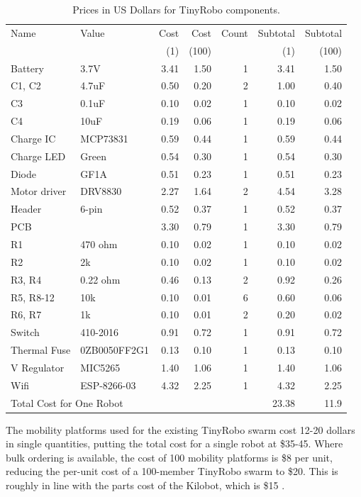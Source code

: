 \begin{table}
	\begin{tabular}{l l r r r r r}
		Name & Value & Cost & Cost & Count & Subtotal & Subtotal\\
		& & (1) & (100) & & (1) & (100)\\
		\hline
		Battery & 3.7V & 3.41 & 1.50 & 1 & 3.41 & 1.50\\
		C1, C2 & 4.7uF & 0.50 & 0.20 & 2 & 1.00 & 0.40\\
		C3 & 0.1uF & 0.10 & 0.02 & 1 & 0.10 & 0.02\\
		C4 & 10uF & 0.19 & 0.06 & 1 & 0.19 & 0.06\\
		Charge IC & MCP73831 & 0.59 & 0.44 & 1 & 0.59 & 0.44\\
		Charge LED & Green & 0.54 & 0.30 & 1 & 0.54 & 0.30\\
		Diode & GF1A & 0.51 & 0.23 & 1 & 0.51 & 0.23\\
		Motor driver & DRV8830 & 2.27 & 1.64 & 2 & 4.54 & 3.28\\
		Header & 6-pin  & 0.52 & 0.37 & 1 & 0.52 & 0.37\\
		PCB &  & 3.30 & 0.79 & 1 & 3.30 & 0.79\\
		R1 & 470 ohm & 0.10 & 0.02 & 1 & 0.10 & 0.02\\
		R2 & 2k & 0.10 & 0.02 & 1 & 0.10 & 0.02\\
		R3, R4 & 0.22 ohm & 0.46 & 0.13 & 2 & 0.92 & 0.26\\
		R5, R8-12 & 10k & 0.10 & 0.01 & 6 & 0.60 & 0.06\\
		R6, R7 & 1k & 0.10 & 0.01 & 2 & 0.20 & 0.02\\
		Switch & 410-2016 & 0.91 & 0.72 & 1 & 0.91 & 0.72\\
		Thermal Fuse & 0ZB0050FF2G1 & 0.13 & 0.10 & 1 & 0.13 & 0.10\\
		V Regulator & MIC5265 & 1.40 & 1.06 & 1 & 1.40 & 1.06\\
		Wifi & ESP-8266-03 & 4.32 & 2.25 & 1 & 4.32 & 2.25\\
		\hline
		\multicolumn{2}{l}{Total Cost for One Robot} &  &  &  & 23.38 & 11.9\\
	\end{tabular}
	\caption{Prices in US Dollars for TinyRobo components.}
	\label{tab:per_robot_parts_cost}
\end{table}

The mobility platforms used for the existing TinyRobo swarm cost 12-20 dollars in single quantities, putting the total cost for a single robot at \$35-45.
Where bulk ordering is available, the cost of 100 mobility platforms is \$8 per unit, reducing the per-unit cost of a 100-member TinyRobo swarm to \$20. 
This is roughly in line with the parts cost of the Kilobot, which is \$15 \citep{rubenstein2014kilobot}.

